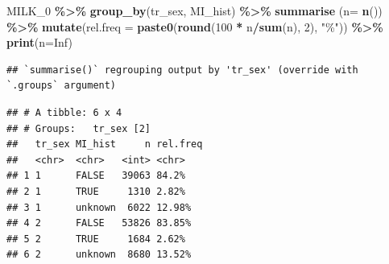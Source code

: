 \documentclass[
]{article}
\newenvironment{Shaded}{\begin{snugshade}}{\end{snugshade}}
\newcommand{\DataTypeTok}[1]{\textcolor[rgb]{0.13,0.29,0.53}{#1}}
\newcommand{\DecValTok}[1]{\textcolor[rgb]{0.00,0.00,0.81}{#1}}
\newcommand{\KeywordTok}[1]{\textcolor[rgb]{0.13,0.29,0.53}{\textbf{#1}}}
\newcommand{\NormalTok}[1]{#1}
\newcommand{\OperatorTok}[1]{\textcolor[rgb]{0.81,0.36,0.00}{\textbf{#1}}}
\newcommand{\OtherTok}[1]{\textcolor[rgb]{0.56,0.35,0.01}{#1}}
\newcommand{\StringTok}[1]{\textcolor[rgb]{0.31,0.60,0.02}{#1}}
\begin{document}
\begin{Shaded}
\begin{Highlighting}[]
\NormalTok{MILK\_}\DecValTok{0} \OperatorTok{\%\textgreater{}\%}\StringTok{ }
\StringTok{  }\KeywordTok{group\_by}\NormalTok{(tr\_sex, MI\_hist) }\OperatorTok{\%\textgreater{}\%}\StringTok{ }
\StringTok{  }\KeywordTok{summarise}\NormalTok{ (}\DataTypeTok{n=} \KeywordTok{n}\NormalTok{()) }\OperatorTok{\%\textgreater{}\%}
\StringTok{  }\KeywordTok{mutate}\NormalTok{(}\DataTypeTok{rel.freq =} \KeywordTok{paste0}\NormalTok{(}\KeywordTok{round}\NormalTok{(}\DecValTok{100} \OperatorTok{*}\StringTok{ }\NormalTok{n}\OperatorTok{/}\KeywordTok{sum}\NormalTok{(n), }\DecValTok{2}\NormalTok{), }\StringTok{"\%"}\NormalTok{))  }\OperatorTok{\%\textgreater{}\%}\StringTok{ }
\StringTok{  }\KeywordTok{print}\NormalTok{(}\DataTypeTok{n=}\OtherTok{Inf}\NormalTok{)}
\end{Highlighting}
\end{Shaded}

\begin{verbatim}
## `summarise()` regrouping output by 'tr_sex' (override with `.groups` argument)
\end{verbatim}

\begin{verbatim}
## # A tibble: 6 x 4
## # Groups:   tr_sex [2]
##   tr_sex MI_hist     n rel.freq
##   <chr>  <chr>   <int> <chr>   
## 1 1      FALSE   39063 84.2%   
## 2 1      TRUE     1310 2.82%   
## 3 1      unknown  6022 12.98%  
## 4 2      FALSE   53826 83.85%  
## 5 2      TRUE     1684 2.62%   
## 6 2      unknown  8680 13.52%
\end{verbatim}
\end{document}
